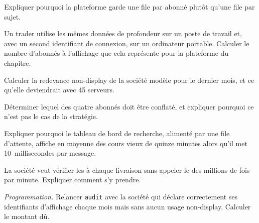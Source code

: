 \begin{exercise}[$\star$]\label{exo:pl:market-data-distribution-and-entitlements:1}
Expliquer pourquoi la plateforme garde une file par abonné plutôt qu'une file par sujet.
\end{exercise}

\begin{exercise}[$\star$]\label{exo:pl:market-data-distribution-and-entitlements:2}
Un trader utilise les mêmes données de profondeur sur un poste de travail et, avec un second identifiant de connexion, sur un ordinateur portable. Calculer le nombre d'abonnés à l'affichage que cela représente pour la
plateforme du chapitre.
\end{exercise}

\begin{exercise}[$\star$]\label{exo:pl:market-data-distribution-and-entitlements:3}
Calculer la redevance non-display de la société modèle pour le dernier mois, et ce qu'elle deviendrait avec 45 serveurs.
\end{exercise}

\begin{exercise}[$\star\star$]\label{exo:pl:market-data-distribution-and-entitlements:4}
Déterminer lequel des quatre abonnés doit être conflaté, et expliquer pourquoi ce n'est pas le cas de la stratégie.
\end{exercise}

\begin{exercise}[$\star\star$]\label{exo:pl:market-data-distribution-and-entitlements:5}
Expliquer pourquoi le tableau de bord de recherche, alimenté par une file d'attente, affiche en moyenne des cours vieux de quinze minutes alors qu'il met 10~millisecondes par message.
\end{exercise}

\begin{exercise}[$\star\star$]\label{exo:pl:market-data-distribution-and-entitlements:6}
La société veut vérifier les  à chaque livraison sans appeler le  des millions de fois par minute. Expliquer comment s'y prendre.
\end{exercise}

\begin{exercise}[$\star\star\star$]\label{exo:pl:market-data-distribution-and-entitlements:7}
\emph{Programmation.} Relancer \texttt{audit} avec la société qui déclare correctement ses identifiants d'affichage chaque mois mais sans aucun usage non-display. Calculer le
montant dû.
\end{exercise}

